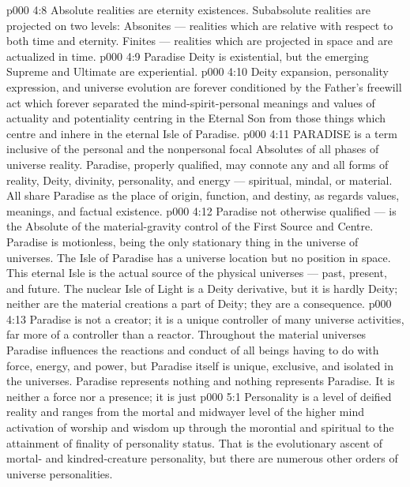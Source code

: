 \vs p000 4:8 \bibnobreakspace {} Absolute realities are eternity existences. Subabsolute realities are projected on two levels: Absonites --- realities which are relative with respect to both time and eternity. Finites --- realities which are projected in space and are actualized in time.
\vs p000 4:9 \bibnobreakspace {} Paradise Deity is existential, but the emerging Supreme and Ultimate are experiential.
\vs p000 4:10 \bibnobreakspace {} Deity expansion, personality expression, and universe evolution are forever conditioned by the Father’s freewill act which forever separated the mind\hyp{}spirit\hyp{}personal meanings and values of actuality and potentiality centring in the Eternal Son from those things which centre and inhere in the eternal Isle of Paradise.
\vs p000 4:11 \pc PARADISE is a term inclusive of the personal and the nonpersonal focal Absolutes of all phases of universe reality. Paradise, properly qualified, may connote any and all forms of reality, Deity, divinity, personality, and energy --- spiritual, mindal, or material. All share Paradise as the place of origin, function, and destiny, as regards values, meanings, and factual existence.
\vs p000 4:12 \pc {} Paradise not otherwise qualified --- is the Absolute of the material\hyp{}gravity control of the First Source and Centre. Paradise is motionless, being the only stationary thing in the universe of universes. The Isle of Paradise has a universe location but no position in space. This eternal Isle is the actual source of the physical universes --- past, present, and future. The nuclear Isle of Light is a Deity derivative, but it is hardly Deity; neither are the material creations a part of Deity; they are a consequence.
\vs p000 4:13 Paradise is not a creator; it is a unique controller of many universe activities, far more of a controller than a reactor. Throughout the material universes Paradise influences the reactions and conduct of all beings having to do with force, energy, and power, but Paradise itself is unique, exclusive, and isolated in the universes. Paradise represents nothing and nothing represents Paradise. It is neither a force nor a presence; it is just 
\vs p000 5:1 Personality is a level of deified reality and ranges from the mortal and midwayer level of the higher mind activation of worship and wisdom up through the morontial and spiritual to the attainment of finality of personality status. That is the evolutionary ascent of mortal\hyp{} and kindred\hyp{}creature personality, but there are numerous other orders of universe personalities.
